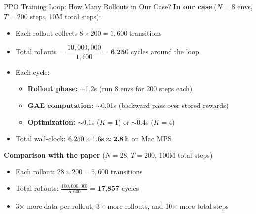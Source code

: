 \documentclass[aspectratio=169,11pt]{beamer}
\begin{document}
\begin{frame}{PPO Training Loop: How Many Rollouts in Our Case?}
  \small
  \textbf{In our case} ($N=8$ envs, $T=200$ steps, 10M total steps):

  \begin{itemize}\setlength\itemsep{3pt}
    \item Each rollout collects $8 \times 200 = 1{,}600$ transitions
    \item Total rollouts = $\dfrac{10{,}000{,}000}{1{,}600} = \textbf{6{,}250}$ cycles around the loop
    \item Each cycle:
      \begin{itemize}\setlength\itemsep{1pt}
        \item \textbf{Rollout phase:} $\sim$1.2s (run 8 envs for 200 steps each)
        \item \textbf{GAE computation:} $\sim$0.01s (backward pass over stored rewards)
        \item \textbf{Optimization:} $\sim$0.1s ($K{=}1$) or $\sim$0.4s ($K{=}4$)
      \end{itemize}
    \item Total wall-clock: $6{,}250 \times 1.6\text{s} \approx \textbf{2.8\,h}$ on Mac MPS
  \end{itemize}

  \medskip
  \textbf{Comparison with the paper} ($N=28$, $T=200$, 100M total steps):
  \begin{itemize}\setlength\itemsep{1pt}
    \item Each rollout: $28 \times 200 = 5{,}600$ transitions
    \item Total rollouts: $\frac{100{,}000{,}000}{5{,}600} = \textbf{17{,}857}$ cycles
    \item 3$\times$ more data per rollout, 3$\times$ more rollouts, and 10$\times$ more total steps
  \end{itemize}
\end{frame}
\end{document}
